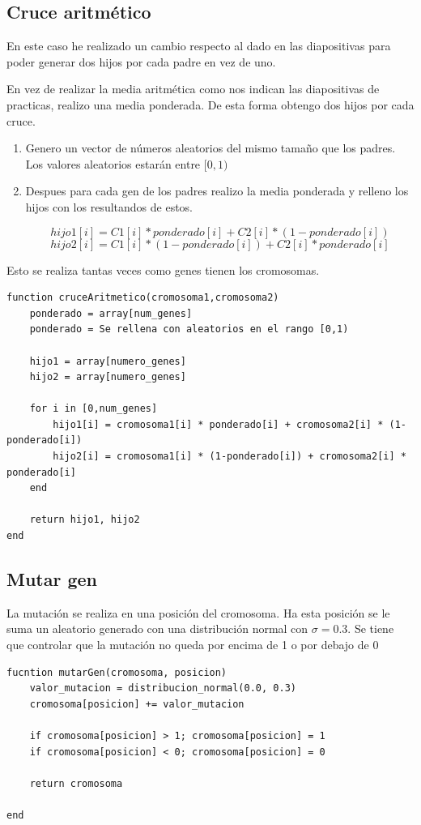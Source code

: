 \documentclass[titlepage]{article}
\begin{document}
	\subsection{Cruce aritmético}
	
	En este caso he realizado un cambio respecto al dado en las diapositivas para poder generar dos hijos por cada padre en vez de uno.
	
	En vez de realizar la media aritmética como nos indican las diapositivas de practicas, realizo una media ponderada. De esta forma obtengo dos hijos por cada cruce.
	
	\begin{enumerate}
		\item Genero un vector de números aleatorios del mismo tamaño que los padres. Los valores aleatorios estarán entre $[0,1)$
		
		\item Despues para cada gen de los padres realizo la media ponderada y relleno los hijos con los resultandos de estos.
		
		$$
		hijo1[i] = C1[i] * ponderado[i] + C2[i] * (1-ponderado[i])
		$$
		$$
		hijo2[i] = C1[i] * (1-ponderado[i]) + C2[i] * ponderado[i]
		$$
		
		
	\end{enumerate} 
	Esto se realiza tantas veces como genes tienen los cromosomas.
	\newpage
	
	
	\begin{lstlisting}
function cruceAritmetico(cromosoma1,cromosoma2)
	ponderado = array[num_genes]
	ponderado = Se rellena con aleatorios en el rango [0,1)
	
	hijo1 = array[numero_genes]
	hijo2 = array[numero_genes]	
	
	for i in [0,num_genes]
		hijo1[i] = cromosoma1[i] * ponderado[i] + cromosoma2[i] * (1-ponderado[i])
		hijo2[i] = cromosoma1[i] * (1-ponderado[i]) + cromosoma2[i] * ponderado[i]
	end
	
	return hijo1, hijo2
end
	\end{lstlisting}
	
	\subsection{Mutar gen}
	La mutación se realiza en una posición del cromosoma. Ha esta posición se le suma un aleatorio generado con una distribución normal con $\sigma = 0.3$. Se tiene que controlar que la mutación no queda por encima de 1 o por debajo de 0
	
	\begin{lstlisting}
fucntion mutarGen(cromosoma, posicion)
	valor_mutacion = distribucion_normal(0.0, 0.3)
	cromosoma[posicion] += valor_mutacion
	
	if cromosoma[posicion] > 1; cromosoma[posicion] = 1	
	if cromosoma[posicion] < 0; cromosoma[posicion] = 0
	
	return cromosoma

end
	\end{lstlisting}	
	\newpage
	
\end{document}
